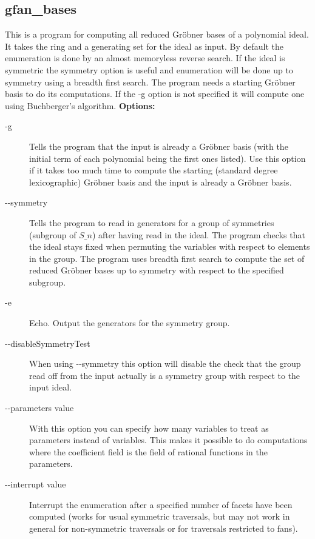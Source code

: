 {\subsection{gfan\_bases}\label{applist:_bases}
This is a program for computing all reduced Gr\"obner bases of a polynomial ideal. It takes the ring and a generating set for the ideal as input. By default the enumeration is done by an almost memoryless reverse search. If the ideal is symmetric the symmetry option is useful and enumeration will be done up to symmetry using a breadth first search. The program needs a starting Gr\"obner basis to do its computations. If the -g option is not specified it will compute one using Buchberger's algorithm.
\newline
{\bf Options:}
\begin{description}
\item[-g]Tells the program that the input is already a Gr\"obner basis (with the initial term of each polynomial being the first ones listed). Use this option if it takes too much time to compute the starting (standard degree lexicographic) Gr\"obner basis and the input is already a Gr\"obner basis.
\item[-\hspace{0.013cm}-symmetry]Tells the program to read in generators for a group of symmetries (subgroup of $S\_n$) after having read in the ideal. The program checks that the ideal stays fixed when permuting the variables with respect to elements in the group. The program uses breadth first search to compute the set of reduced Gr\"obner bases up to symmetry with respect to the specified subgroup.
\item[-e]Echo. Output the generators for the symmetry group.
\item[-\hspace{0.013cm}-disableSymmetryTest]When using -\hspace{0.013cm}-symmetry this option will disable the check that the group read off from the input actually is a symmetry group with respect to the input ideal.
\item[-\hspace{0.013cm}-parameters value]With this option you can specify how many variables to treat as parameters instead of variables. This makes it possible to do computations where the coefficient field is the field of rational functions in the parameters.\item[-\hspace{0.013cm}-interrupt value]Interrupt the enumeration after a specified number of facets have been computed (works for usual symmetric traversals, but may not work in general for non-symmetric traversals or for traversals restricted to fans).\end{description}


}
